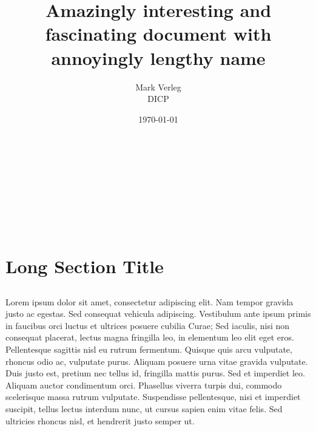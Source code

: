 \documentclass[a4paper,UTF8]{article}
\newcommand{\authorname}{Mark Verleg}
\newcommand{\departmentname}{DICP}
\newcommand{\longtitle}{Amazingly interesting and fascinating document with annoyingly lengthy name}
\begin{document}
	\title{\longtitle}
	\author{\authorname \\ \departmentname}
	\date{\today}
	\maketitle

	\begin{abstract}

	\end{abstract}

	\begin{center}
		~\\ ~\\ ~\\ ~\\ ~\\ ~\\
	\end{center}

	\newpage

	\tableofcontents
	\newpage

	\section[Short Section Title]{Long Section Title}
		\subsection{}
			\paragraph{}
				Lorem ipsum dolor sit amet, consectetur adipiscing elit. Nam tempor gravida justo ac egestas. Sed consequat vehicula adipiscing. Vestibulum ante ipsum primis in faucibus orci luctus et ultrices posuere cubilia Curae; Sed iaculis, nisi non consequat placerat, lectus magna fringilla leo, in elementum leo elit eget eros. Pellentesque sagittis nisl eu rutrum fermentum. Quisque quis arcu vulputate, rhoncus odio ac, vulputate purus. Aliquam posuere urna vitae gravida vulputate. Duis justo est, pretium nec tellus id, fringilla mattis purus. Sed et imperdiet leo. Aliquam auctor condimentum orci. Phasellus viverra turpis dui, commodo scelerisque massa rutrum vulputate. Suspendisse pellentesque, nisi et imperdiet suscipit, tellus lectus interdum nunc, ut cursus sapien enim vitae felis. Sed ultricies rhoncus nisl, et hendrerit justo semper ut.
\end{document}
